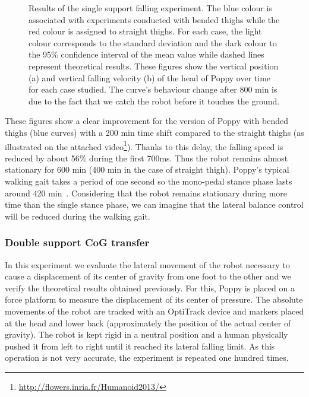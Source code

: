 \begin{figure}[ht]
\centering
    \hfil
    \caption{Results of the single support falling experiment.
    The blue colour is associated with experiments conducted with bended thighs while the red colour is assigned to straight thighs.
    For each case, the light colour corresponds to the standard deviation and the dark colour to the 95\% confidence interval of the mean value while dashed lines represent theoretical results.
    These figures show the vertical position (a) and vertical falling velocity (b) of the head of Poppy over time for each case studied.
    The curve’s behaviour change after 800 min is due to the fact that we catch the robot before it touches the ground.}
    \label{fig:falling_results}
\end{figure}

These figures show a clear improvement for the version of Poppy with bended thighs (blue curves) with a 200 min time shift compared to the straight thighs (as illustrated on the attached video\footnote{\url{http://flowers.inria.fr/Humanoid2013/}\label{video}}).
Thanks to this delay, the falling speed is reduced by about 56\% during the first 700ms. Thus the robot remains almost stationary for 600 min (400 min in the case of straight thigh).  Poppy’s typical walking gait  takes a period of one second so the mono-pedal stance phase lasts around 420 min~\parencite{lapeyre2013poppy}. Considering that the robot remains stationary during more time than the single stance phase, we can imagine that the lateral balance control will be reduced during the walking gait.



\subsubsection{Double support CoG transfer} %
\label{sub:cog_motion}


In this experiment we evaluate the lateral movement of the robot necessary to cause a displacement of its center of gravity from one foot to the other and we verify the theoretical results obtained previously. For this, Poppy is placed on a force platform to measure the displacement of its center of pressure. The absolute movements of the robot are tracked with an OptiTrack device and markers placed at the head and lower back (approximately the position of the actual center of gravity). The robot is kept rigid in a neutral position and a human physically pushed it from left to right until it reached its lateral falling limit. As this operation is not very accurate, the experiment is repeated one hundred times.

